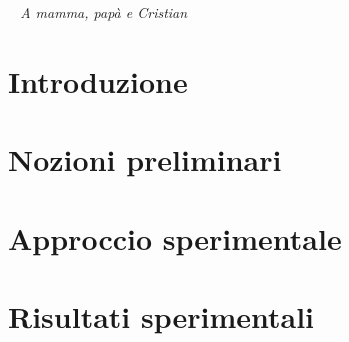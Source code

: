\documentclass[a4paper,12pt]{book}
\begin{document}

\thispagestyle{empty} %
\cleardoublepage

\clearpage{\pagestyle{plain}\cleardoublepage}
\vspace*{\fill}
\begin{flushright}
\textit{~ A mamma, papà e Cristian ~}
\end{flushright}
\vspace*{\fill}

\thispagestyle{empty}

\clearpage{\pagestyle{plain}\cleardoublepage}
\tableofcontents %

\clearpage{\pagestyle{plain}\cleardoublepage} %

\clearpage{\pagestyle{plain}\cleardoublepage} %
\chapter*{Introduzione} %
\label{chapter:zero} %

\clearpage{\pagestyle{plain}\cleardoublepage} %
\chapter{Nozioni preliminari} %
\label{chapter:primo} %

\clearpage{\pagestyle{plain}\cleardoublepage} %
\chapter{Approccio sperimentale} %
\label{chapter:secondo} %

\clearpage{\pagestyle{plain}\cleardoublepage} %
\chapter{Risultati sperimentali} %
\label{chapter:terzo} %
\end{document}
